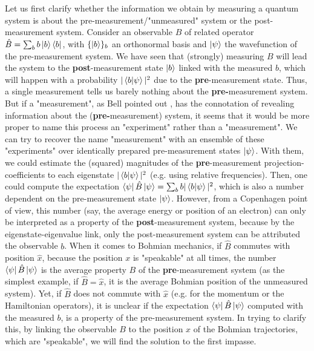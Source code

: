 \documentclass[11pt, a4paper]{article} %
\begin{document}
Let us first clarify whether the information we obtain by measuring a quantum system is about the pre-measurement/"unmeasured" system or the post-measurement system. Consider an observable $B$ of related operator $\hat{B}=\sum_b b\ket{b}\bra{b}$, with $\{\ket{b}\}_b$ an orthonormal basis and $\ket{\psi}$ the wavefunction of the pre-measurement system. We have seen that (strongly) measuring $B$ will lead the system to the {\bf post}-measurement state $\ket{b}$ linked with the measured $b$, which will happen with a probability $|\bra{b}\ket{\psi}|^2$ due to the {\bf pre}-measurement state. Thus, a single measurement tells us barely nothing about the {\bf pre-}measurement system. But if a "measurement", as Bell pointed out \cite{Bell}, has the connotation of revealing information about the ({\bf pre-}measurement) system, it seems that it would be more proper to name this process an "experiment" rather than a "measurement". We can try to recover the name "measurement" with an ensemble of these "experiments" over identically prepared pre-measurement states $\ket{\psi}$. With them, we could estimate the (squared) magnitudes of the {\bf pre}-measurement projection-coefficients to each eigenstate $|\bra{b}\ket{\psi}|^2$ (e.g. using relative frequencies). Then, one could compute the expectation $\bra{\psi} \hat B \ket{\psi}=\sum_b b |\bra{b}\ket{\psi}|^2$, which is also a number dependent on the pre-measurement state $\ket{\psi}$. However, from a Copenhagen point of view, this number (say, the average energy or position of an electron) can only be interpreted as a property of the {\bf post}-measurement system, because by the eigenstate-eigenvalue link, only the post-measurement system can be attributed the observable $b$. When it comes to Bohmian mechanics, if $\hat{B}$ commutes with position $\hat{x}$, because the position $x$ is "speakable" at all times, the number $\bra{\psi} \hat B \ket{\psi}$ is the average property $B$ of the {\bf pre}-measurement system (as the simplest example, if $\hat{B}=\hat{x}$, it is the average Bohmian position of the unmeasured system). Yet, if $\hat{B}$ does not commute with $\hat{x}$ (e.g. for the momentum or the Hamiltonian operators), it is unclear if the expectation $\bra{\psi} \hat B \ket{\psi}$ computed with the measured $b$, is a property of the pre-measurement system. In trying to clarify this, by linking the observable $B$ to the position $x$ of the Bohmian trajectories, which are "speakable", we will find the solution to the first impasse.
\end{document}
